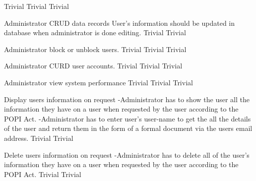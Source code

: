   	{Trivial}
	 	{Trivial}
  	{Trivial}
 
\FuncReq
    {Administrator CRUD data records}
		{User's information should be updated in database when administrator is done editing.}
		{Trivial}
 		{Trivial}

\FuncReq
    {Administrator block or unblock users.}   
    {Trivial}
    {Trivial}
    {Trivial}
				
\FuncReq
    {Administrator CURD user accounts.}
    {Trivial}
    {Trivial}
 	 	{Trivial}

\FuncReq
    {Administrator view system performance}
    {Trivial}
    {Trivial}
    {Trivial}

\FuncReq
    {Display users information on request}
    {-Administrator has to show the user all the information they have on a user when requested by the user according to the POPI Act.
  	-Administrator has to enter user's user-name to get the all the details of the user and return them in the form of a formal document via the users email address.
    }
	{Trivial}
	{Trivial}

\FuncReq
  {Delete users information on request}
	{-Administrator has to delete all of the user's information they have on a user when requested by the user according to the POPI Act.}
	{Trivial}
	{Trivial}

